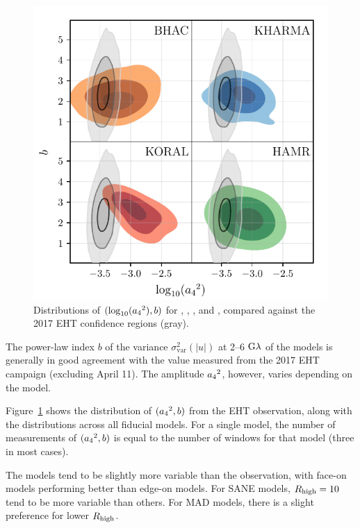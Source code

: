 \begin{figure}
  \centering
  \includegraphics[width=\columnwidth]{./figures/grmhd_triangle_debiased_combined.pdf}
  \caption{Distributions of $(\log_{10}({a_4}^2), b)$ for \bhac, \kharma, \koral, and \hamr, compared against the 2017 EHT confidence regions (gray).}
  \label{fig:cmp_VLBI_var}
\end{figure}

The power-law index $b$ of the variance $\sigma_\text{var}^2 (|u|)$ at 2--6$~{\rm G}\lambda$ of the models is generally in good agreement with the value measured  from the 2017 EHT campaign (excluding April 11).
The amplitude ${a_4}^2$, however, varies depending on the model.

Figure~\ref{fig:cmp_VLBI_var} shows the distribution of $({a_4}^2, b)$ from the EHT observation, along with the distributions across all fiducial models.
For a single model, the number of measurements of $({a_4}^2, b)$ is equal to the number of windows for that model (three in most cases).

The models tend to be slightly more variable than the observation, with face-on models performing better than edge-on models.
For SANE models, $R_\mathrm{high} = 10$ tend to be more variable than others.
For MAD models, there is a slight preference for lower $R_\mathrm{high}$.


